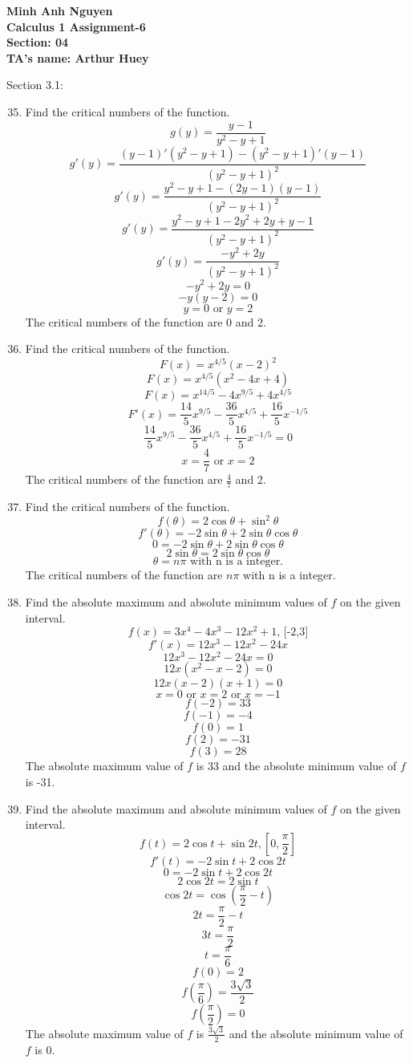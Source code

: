 \documentclass[12pt]{article}
\begin{document}
\textbf{Minh Anh Nguyen }\\
\textbf{Calculus 1 Assignment-6}\\
\textbf{Section: 04}\\
\textbf{TA's name: Arthur Huey}

\hrulefill

Section 3.1:

\begin{enumerate}
    \setcounter{enumi}{34}
    \item Find the critical numbers of the function.\\
        \[g(y) = \frac{y-1}{y^2-y+1}\]
        \[g'(y) = \frac{(y-1)'(y^2-y+1) - (y^2-y+1)'(y-1)}{(y^2-y+1)^2}\]
        \[g'(y) = \frac{y^2-y+1 - (2y-1)(y-1)}{(y^2-y+1)^2}\]
        \[g'(y) = \frac{y^2-y+1 - 2y^2+2y+y-1}{(y^2-y+1)^2}\]
        \[g'(y) = \frac{-y^2+2y}{(y^2-y+1)^2}\]
        \[-y^2+2y=0\]
        \[-y(y-2)=0\]
        \[y = 0 \text{ or } y = 2\]
        The critical numbers of the function are 0 and 2.
    \setcounter{enumi}{40}
    \item Find the critical numbers of the function.
        \[F(x) = x^{4/5}(x-2)^2\]
        \[F(x) = x^{4/5}(x^2-4x+4)\]
        \[F(x) = x^{14/5}-4x^{9/5}+4x^{4/5}\]
        \[F'(x) = \frac{14}{5}x^{9/5}-\frac{36}{5}x^{4/5}+\frac{16}{5}x^{-1/5}\]
        \[\frac{14}{5}x^{9/5}-\frac{36}{5}x^{4/5}+\frac{16}{5}x^{-1/5}=0\]
        \[x = \frac{4}{7} \text{ or } x = 2\]
        The critical numbers of the function are ${\displaystyle \frac{4}{7}}$ and 2.
    \newpage
    \setcounter{enumi}{44}
    \item Find the critical numbers of the function.
        \[f(\theta) = 2\cos\theta + \sin^2\theta\]
        \[f'(\theta) = -2\sin\theta + 2\sin\theta\cos\theta\]
        \[0 = -2\sin\theta + 2\sin\theta\cos\theta\]
        \[2\sin\theta = 2\sin\theta\cos\theta\]
        \[\theta = n\pi \text{ with n is a integer.}\]
        The critical numbers of the function are $n\pi$ with n is a integer.
    \setcounter{enumi}{52}
    \item Find the absolute maximum and absolute minimum values of $f$ on the given interval.
        \[f(x)=3x^4-4x^3-12x^2+1\text{, [-2,3]}\]
        \[f'(x)=12x^3-12x^2-24x\]
        \[12x^3-12x^2-24x=0\]
        \[12x(x^2-x-2)=0\]
        \[12x(x-2)(x+1)=0\]
        \[x = 0 \text{ or } x = 2 \text{ or } x=-1\]
        \[f(-2) = 33\]
        \[f(-1) = -4\]
        \[f(0) = 1\]
        \[f(2) = -31\]
        \[f(3) = 28\]
        The absolute maximum value of $f$ is 33 and the absolute minimum value of $f$ is -31.
    \setcounter{enumi}{58}
    \item Find the absolute maximum and absolute minimum values of $f$ on the given interval.
        \[f(t) = 2\cos t + \sin 2t, [0,\frac{\pi}{2}]\]
        \[f'(t) = -2\sin t + 2\cos 2t\]
        \[0 = -2\sin t + 2\cos 2t\]
        \[2\cos 2t = 2\sin t\]
        \[\cos 2t = \cos (\frac{\pi}{2} - t)\]
        \[2t = \frac{\pi}{2} - t\]
        \[3t = \frac{\pi}{2}\]
        \[t = \frac{\pi}{6}\]
        \[f(0) = 2\]
        \[f(\frac{\pi}{6}) = \frac{3\sqrt{3}}{2}\]
        \[f(\frac{\pi}{2}) = 0\]
        The absolute maximum value of $f$ is ${\displaystyle \frac{3\sqrt{3}}{2}}$ and the absolute minimum value of $f$ is 0.
\end{enumerate}
\end{document}
